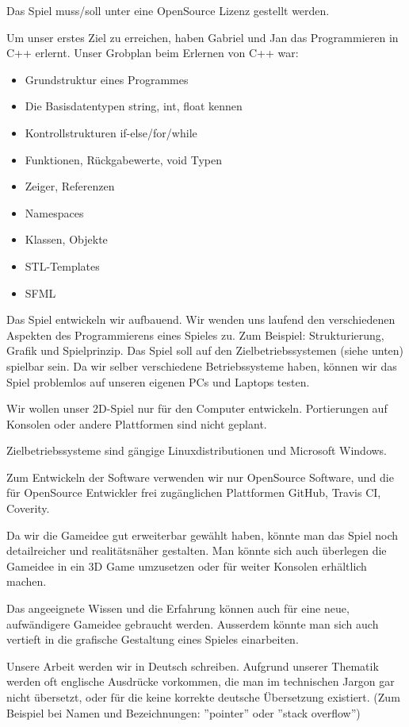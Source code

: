 \documentclass[parskip=half]{scrreprt}
\begin{document}
\begin{contract}
Das Spiel muss/soll unter eine OpenSource Lizenz gestellt werden.


Um unser erstes Ziel zu erreichen, haben Gabriel und Jan das Programmieren in C++ erlernt. Unser Grobplan beim Erlernen von C++ war:
\begin{itemize}
\item Grundstruktur eines Programmes
\item Die Basisdatentypen string, int, float kennen
\item Kontrollstrukturen if-else/for/while
\item Funktionen, Rückgabewerte, void Typen
\item Zeiger, Referenzen
\item Namespaces
\item Klassen, Objekte
\item STL-Templates
\item SFML
\end{itemize}

Das Spiel entwickeln wir aufbauend. Wir wenden uns laufend den verschiedenen Aspekten des Programmierens eines Spieles zu. Zum Beispiel: Strukturierung, Grafik und Spielprinzip. Das Spiel soll auf den Zielbetriebssystemen (siehe unten) spielbar sein. Da wir selber verschiedene Betriebssysteme haben, können wir das Spiel problemlos auf unseren eigenen PCs und Laptops testen.


Wir wollen unser 2D-Spiel nur für den Computer entwickeln. Portierungen auf Konsolen oder andere Plattformen sind nicht geplant.

Zielbetriebssysteme sind gängige Linuxdistributionen und Microsoft Windows.

Zum Entwickeln der Software verwenden wir nur OpenSource Software, und die für OpenSource Entwickler frei zugänglichen Plattformen GitHub, Travis CI, Coverity.


Da wir die Gameidee gut erweiterbar gewählt haben, könnte man das Spiel noch detailreicher und realitätsnäher gestalten. Man könnte sich auch überlegen die Gameidee in ein 3D Game umzusetzen oder für weiter Konsolen erhältlich machen.

Das angeeignete Wissen und die Erfahrung können auch für eine neue, aufwändigere Gameidee gebraucht werden. Ausserdem könnte man sich auch vertieft in die grafische Gestaltung eines Spieles einarbeiten.


Unsere Arbeit werden wir in Deutsch schreiben. Aufgrund unserer Thematik werden oft englische Ausdrücke vorkommen, die man im technischen Jargon gar nicht übersetzt, oder für die keine korrekte deutsche Übersetzung existiert. (Zum Beispiel bei Namen und Bezeichnungen: ''pointer'' oder ''stack overflow'')



\end{contract}
\end{document}
